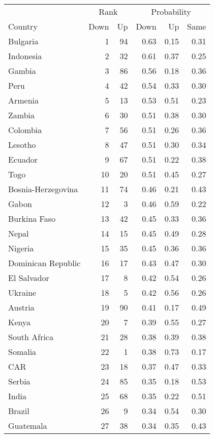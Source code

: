 
\begin{longtable}[t]{lrrrrr}
\toprule
\multicolumn{1}{c}{ } & \multicolumn{2}{c}{Rank} & \multicolumn{3}{c}{Probability} \\
\cmidrule(l{3pt}r{3pt}){2-3} \cmidrule(l{3pt}r{3pt}){4-6}
Country & Down & Up & Down & Up & Same\\
\midrule
Bulgaria & 1 & 94 & 0.63 & 0.15 & 0.31\\
Indonesia & 2 & 32 & 0.61 & 0.37 & 0.25\\
Gambia & 3 & 86 & 0.56 & 0.18 & 0.36\\
Peru & 4 & 42 & 0.54 & 0.33 & 0.30\\
Armenia & 5 & 13 & 0.53 & 0.51 & 0.23\\
\addlinespace
Zambia & 6 & 30 & 0.51 & 0.38 & 0.30\\
Colombia & 7 & 56 & 0.51 & 0.26 & 0.36\\
Lesotho & 8 & 47 & 0.51 & 0.30 & 0.34\\
Ecuador & 9 & 67 & 0.51 & 0.22 & 0.38\\
Togo & 10 & 20 & 0.51 & 0.45 & 0.27\\
\addlinespace
Bosnia-Herzegovina & 11 & 74 & 0.46 & 0.21 & 0.43\\
Gabon & 12 & 3 & 0.46 & 0.59 & 0.22\\
Burkina Faso & 13 & 42 & 0.45 & 0.33 & 0.36\\
Nepal & 14 & 15 & 0.45 & 0.49 & 0.28\\
Nigeria & 15 & 35 & 0.45 & 0.36 & 0.36\\
\addlinespace
Dominican Republic & 16 & 17 & 0.43 & 0.47 & 0.30\\
El Salvador & 17 & 8 & 0.42 & 0.54 & 0.26\\
Ukraine & 18 & 5 & 0.42 & 0.56 & 0.26\\
Austria & 19 & 90 & 0.41 & 0.17 & 0.49\\
Kenya & 20 & 7 & 0.39 & 0.55 & 0.27\\
\addlinespace
South Africa & 21 & 28 & 0.38 & 0.39 & 0.38\\
Somalia & 22 & 1 & 0.38 & 0.73 & 0.17\\
CAR & 23 & 18 & 0.37 & 0.47 & 0.33\\
Serbia & 24 & 85 & 0.35 & 0.18 & 0.53\\
India & 25 & 68 & 0.35 & 0.22 & 0.51\\
\addlinespace
Brazil & 26 & 9 & 0.34 & 0.54 & 0.30\\
Guatemala & 27 & 38 & 0.34 & 0.35 & 0.43\\

\end{longtable}
